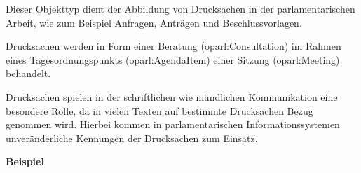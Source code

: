 \documentclass[,a4paper]{article}
\begin{document}

Dieser Objekttyp dient der Abbildung von Drucksachen in der
parlamentarischen Arbeit, wie zum Beispiel Anfragen, Anträgen und
Beschlussvorlagen.

Drucksachen werden in Form einer Beratung (oparl:Consultation) im Rahmen
eines Tagesordnungspunkts (oparl:AgendaItem) einer Sitzung
(oparl:Meeting) behandelt.

Drucksachen spielen in der schriftlichen wie mündlichen Kommunikation
eine besondere Rolle, da in vielen Texten auf bestimmte Drucksachen
Bezug genommen wird. Hierbei kommen in parlamentarischen
Informationssystemen unveränderliche Kennungen der Drucksachen zum
Einsatz.

\textbf{Beispiel}
\end{document}
